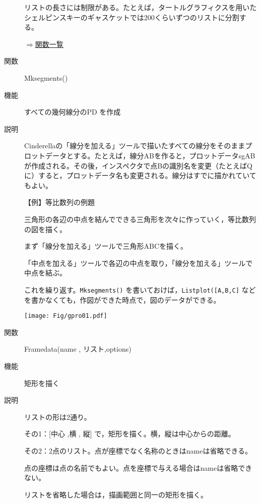 \documentclass[papersize,a4paper,10pt,uplatex]{jsarticle}
\begin{document}
\begin{description}
\vspace{\baselineskip}
 リストの長さには制限がある。たとえば，タートルグラフィクスを用いたシェルピンスキーのギャスケットでは200くらいずつのリストに分割する。
 
 \hspace{20mm}\scalebox{0.8}{ }
\begin{flushright}\hyperlink{functionlist}{$\Rightarrow$関数一覧}\end{flushright}

\vspace{\baselineskip}
\hypertarget{mksegments}{}
\item[関数]Mksegments()
\item[機能]すべての幾何線分のPD を作成
\item[説明]Cinderellaの「線分を加える」ツールで描いたすべての線分をそのままプロットデータとする。たとえば，線分ABを作ると，プロットデータsgABが作成される。その後，インスペクタで点Bの識別名を変更（たとえばQに）すると，プロットデータ名も変更される。線分はすでに描かれていてもよい。

\vspace{\baselineskip}
【例】等比数列の例題

三角形の各辺の中点を結んでできる三角形を次々に作っていく，等比数列の図を描く。

まず「線分を加える」ツールで三角形ABCを描く。

「中点を加える」ツールで各辺の中点を取り，「線分を加える」ツールで中点を結ぶ。

これを繰り返す。\verb|Mksegments()| を書いておけば，\verb|Listplot([A,B,C]| などを書かなくても，作図ができた時点で，図のデータができる。

\texttt{[image: Fig/gpro01.pdf]} 

\vspace{\baselineskip}
\hypertarget{framedata}{}
\item[関数]Framedata(name , リスト,options)
\item[機能]矩形を描く
\item[説明]リストの形は2通り。

その1：[中心 ,横 , 縦] で，矩形を描く。横，縦は中心からの距離。

その2：2点のリスト。点が座標でなく名称のときはnameは省略できる。

点の座標は点の名前でもよい。点を座標で与える場合はnameは省略できない。

リストを省略した場合は，描画範囲と同一の矩形を描く。


\end{description}
\end{document}
